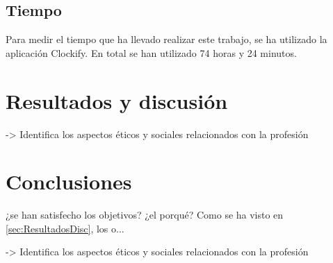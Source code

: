 \documentclass{article}
\begin{document}

        \subsection{Tiempo} %
        \label{sub:Tiempo}

            Para medir el tiempo que ha llevado realizar este trabajo, se ha utilizado la aplicación
            Clockify\cite{clockify}.\newline
            En total se han utilizado 74 horas y 24 minutos.%



\section{Resultados y discusión}
\label{sec:ResultadosyDiscusion}

    -> Identifica los aspectos éticos y sociales relacionados con la profesión


\section{Conclusiones}
\label{sec:Conclusiones}

    ¿se han satisfecho los objetivos? ¿el porqué? Como se ha visto en \ref{sec:ResultadosDisc}, los o...

    -> Identifica los aspectos éticos y sociales relacionados con la profesión




\end{document}
